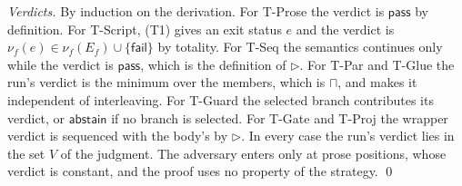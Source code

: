 \documentclass[11pt]{article}
\theoremstyle{definition}
\theoremstyle{plain}
\newcommand{\pass}{\mathsf{pass}}
\newcommand{\abst}{\mathsf{abstain}}
\newcommand{\fail}{\mathsf{fail}}
\newcommand{\vseq}{\mathbin{\triangleright}}
\newcommand{\vpar}{\mathbin{\sqcap}}
\begin{document}
\emph{Verdicts.} By induction on the derivation. For T-Prose the verdict is $\pass$ by definition. For T-Script, (T1) gives an exit status $e$ and the verdict is $\nu_f(e) \in \nu_f(E_f) \cup \{\fail\}$ by totality. For T-Seq the semantics continues only while the verdict is $\pass$, which is the definition of $\vseq$. For T-Par and T-Glue the run's verdict is the minimum over the members, which is $\vpar$, and  makes it independent of interleaving. For T-Guard the selected branch contributes its verdict, or $\abst$ if no branch is selected. For T-Gate and T-Proj the wrapper verdict is sequenced with the body's by $\vseq$. In every case the run's verdict lies in the set $V$ of the judgment. The adversary enters only at prose positions, whose verdict is constant, and the proof uses no property of the strategy. \qed
\end{document}
